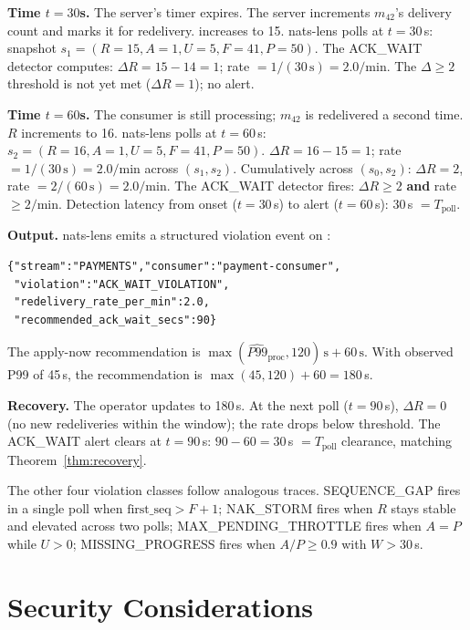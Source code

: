 \documentclass[journal]{IEEEtran}
\begin{document}
\textbf{Time $t=30$s.} The server's  timer expires.
The server increments $m_{42}$'s delivery count and marks it for
redelivery.  increases to 15.
nats-lens polls at $t=30$\,s: snapshot $s_1 = (R=15, A=1, U=5, F=41, P=50)$.
The ACK\_WAIT detector computes:
$\Delta R = 15 - 14 = 1$; rate $= 1/(30\,\text{s}) = 2.0/\text{min}$.
The $\Delta\geq 2$ threshold is not yet met ($\Delta R = 1$); no alert.

\textbf{Time $t=60$s.} The consumer is still processing; $m_{42}$ is
redelivered a second time. $R$ increments to 16.
nats-lens polls at $t=60$\,s: $s_2 = (R=16, A=1, U=5, F=41, P=50)$.
$\Delta R = 16 - 15 = 1$; rate $= 1/(30\,\text{s}) = 2.0/\text{min}$ across
$(s_1, s_2)$. Cumulatively across $(s_0, s_2)$: $\Delta R = 2$, rate $= 2/(60\,\text{s}) = 2.0/\text{min}$. The ACK\_WAIT detector fires: $\Delta R \geq 2$ \textbf{and} rate $\geq 2/\text{min}$.
Detection latency from onset ($t=30$\,s) to alert ($t=60$\,s): 30\,s $= T_\text{poll}$.

\textbf{Output.} nats-lens emits a structured violation event on
:
\begin{lstlisting}
{"stream":"PAYMENTS","consumer":"payment-consumer",
 "violation":"ACK_WAIT_VIOLATION",
 "redelivery_rate_per_min":2.0,
 "recommended_ack_wait_secs":90}
\end{lstlisting}
The apply-now recommendation is $\max(\hat{P99}_\text{proc}, 120)\,\text{s} + 60\,\text{s}$.
With observed P99 of 45\,s, the recommendation is $\max(45,120)+60=180$\,s.

\textbf{Recovery.} The operator updates  to 180\,s.
At the next poll ($t=90$\,s), $\Delta R = 0$ (no new redeliveries within the window);
the rate drops below threshold. The ACK\_WAIT alert clears at $t=90$\,s:
$90-60 = 30$\,s $= T_\text{poll}$ clearance, matching Theorem~\ref{thm:recovery}.

The other four violation classes follow analogous traces.
SEQUENCE\_GAP fires in a single poll when $\text{first\_seq} > F+1$;
NAK\_STORM fires when $R$ stays stable and elevated across two polls;
MAX\_PENDING\_THROTTLE fires when $A=P$ while $U>0$;
MISSING\_PROGRESS fires when $A/P \geq 0.9$ with $W>30$\,s.

\section{Security Considerations}
\label{sec:security}
\end{document}
